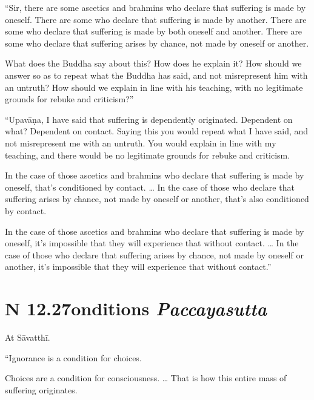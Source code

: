 \documentclass[12pt,openany]{book}%
\newcommand*{\suttatitleacronym}[1]{\smaller[2]{#1}\vspace*{.3em}}
\newcommand*{\suttatitletranslation}[1]{\linebreak{#1}}
\newcommand*{\suttatitleroot}[1]{\linebreak\smaller[2]\itshape{#1}}
\newcommand*{\tocacronym}[1]{\hspace*{-3.3em}{#1}\quad}
\newcommand*{\toctranslation}[1]{#1}
\newcommand*{\tocroot}[1]{(\textit{#1})}
\begin{document}
“Sir, there are some ascetics and brahmins who declare that suffering is made by oneself. There are some who declare that suffering is made by another. There are some who declare that suffering is made by both oneself and another. There are some who declare that suffering arises by chance, not made by oneself or another. 

What does the Buddha say about this? How does he explain it? How should we answer so as to repeat what the Buddha has said, and not misrepresent him with an untruth? How should we explain in line with his teaching, with no legitimate grounds for rebuke and criticism?” 

“\textsanskrit{Upavāṇa}, I have said that suffering is dependently originated. Dependent on what? Dependent on contact. Saying this you would repeat what I have said, and not misrepresent me with an untruth. You would explain in line with my teaching, and there would be no legitimate grounds for rebuke and criticism. 

In the case of those ascetics and brahmins who declare that suffering is made by oneself, that’s conditioned by contact. … In the case of those who declare that suffering arises by chance, not made by oneself or another, that’s also conditioned by contact. 

In the case of those ascetics and brahmins who declare that suffering is made by oneself, it’s impossible that they will experience that without contact. … In the case of those who declare that suffering arises by chance, not made by oneself or another, it’s impossible that they will experience that without contact.” 

%
\section*{{\suttatitleacronym SN 12.27}{\suttatitletranslation Conditions }{\suttatitleroot Paccayasutta}}
\addcontentsline{toc}{section}{\tocacronym{SN 12.27} \toctranslation{Conditions } \tocroot{Paccayasutta}}

At \textsanskrit{Sāvatthī}. 

“Ignorance is a condition for choices. 

Choices are a condition for consciousness. … That is how this entire mass of suffering originates. 
\end{document}

